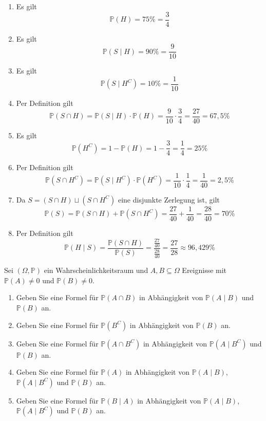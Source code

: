 \documentclass{article}
\begin{document}
\begin{solution}
\begin{enumerate}
\item {
Es gilt
\[
\mathbb{P}(H) = 75\% = \frac{3}{4}
\]
}
\item {
Es gilt
\[
\mathbb{P}(S \mid H) = 90\% = \frac{9}{10}
\]
}
\item {
Es gilt
\[
\mathbb{P}(S \mid H^C) = 10\% = \frac{1}{10}
\]
}
\item {
Per Definition gilt
\[
\mathbb{P}(S \cap H) = \mathbb{P}(S \mid H) \cdot \mathbb{P}(H) = \frac{9}{10} \cdot \frac{3}{4} = \frac{27}{40} = 67{,}5\%
\]
}
\item {
Es gilt
\[
\mathbb{P}(H^C) = 1 - \mathbb{P}(H) = 1 - \frac{3}{4} = \frac{1}{4} = 25\%
\]
}
\item {
Per Definition gilt
\[
\mathbb{P}(S \cap H^C) = \mathbb{P}(S \mid H^C) \cdot \mathbb{P}(H^C) = \frac{1}{10} \cdot \frac{1}{4} = \frac{1}{40} = 2{,}5\%
\]
}
\item {
Da $S = (S \cap H) \sqcup (S \cap H^C)$ eine disjunkte Zerlegung ist, gilt
\[
\mathbb{P}(S) = \mathbb{P}(S \cap H) + \mathbb{P}(S \cap H^C) = \frac{27}{40} + \frac{1}{40} = \frac{28}{40} = 70\%
\]
}
\item {
Per Definition gilt
\[
\mathbb{P}(H \mid S) = \frac{\mathbb{P}(S \cap H)}{\mathbb{P}(S)} = \frac{\frac{27}{40}}{\frac{28}{40}} = \frac{27}{28} \approx 96{,}429\%
\]
}
\end{enumerate}
\end{solution}

\newpage

\begin{problem}
Sei $(\Omega, \mathbb{P})$ ein Wahrscheinlichkeitsraum und $A, B \subseteq \Omega$ Ereignisse mit $\mathbb{P}(A) \neq 0$ und $\mathbb{P}(B) \neq 0$.
\begin{enumerate}
\item {
Geben Sie eine Formel für $\mathbb{P}(A \cap B)$ in Abhängigkeit von $\mathbb{P}(A \mid B)$ und $\mathbb{P}(B)$ an.
}
\item {
Geben Sie eine Formel für $\mathbb{P}(B^C)$ in Abhängigkeit von $\mathbb{P}(B)$ an.
}
\item {
Geben Sie eine Formel für $\mathbb{P}(A \cap B^C)$ in Abhängigkeit von $\mathbb{P}(A \mid B^C)$ und $\mathbb{P}(B)$ an.
}
\item {
Geben Sie eine Formel für $\mathbb{P}(A)$ in Abhängigkeit von $\mathbb{P}(A \mid B)$, $\mathbb{P}(A \mid B^C)$ und $\mathbb{P}(B)$ an.
}
\item {
Geben Sie eine Formel für $\mathbb{P}(B \mid A)$ in Abhängigkeit von $\mathbb{P}(A \mid B)$, $\mathbb{P}(A \mid B^C)$ und $\mathbb{P}(B)$ an.
}
\end{enumerate}
\end{problem}
\end{document}
